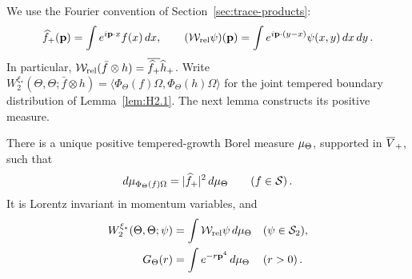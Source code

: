 We use the Fourier convention of Section~\ref{sec:trace-products}:
\begin{equation*}
\widehat{f}_{+}(\mathbf p)=\int e^{i\mathbf p\cdot x}f(x)\,dx,
\qquad (\mathcal{W}_{\mathrm{rel}}\psi)(\mathbf p)=\int e^{i\mathbf p\cdot(y-x)}\psi(x,y)\,dx\,dy\,.
\end{equation*}
In particular, $\mathcal{W}_{\mathrm{rel}}(\bar f\otimes h)=\overline{\widehat{f}_{+}}\widehat{h}_{+}$. Write $W_2^{\xi_*}(\Theta,\Theta;\bar f\otimes h)=\langle\Phi_\Theta(f)\Omega,\Phi_\Theta(h)\Omega\rangle$ for the joint tempered boundary distribution of Lemma~\ref{lem:H2.1}. The next lemma constructs its positive measure.
\begin{lemma}\label{lem:I1.2}
There is a unique positive tempered-growth Borel measure $\mu_{\Theta}$, supported in $\overline{V}_+$, such that
\begin{equation*}
d\mu_{\Phi_\Theta(f)\Omega}=|\widehat{f}_{+}|^2\,d\mu_{\Theta}
\qquad(f\in\mathcal S)\,.
\end{equation*}
It is Lorentz invariant in momentum variables, and
\begin{align*}
W_2^{\xi_*}(\Theta,\Theta;\psi)&=\int\mathcal{W}_{\mathrm{rel}}\psi\,d\mu_{\Theta}&& (\psi\in\mathcal S_2),\\
G_{\Theta}(r)&=\int e^{-r\mathbf p^4}\,d\mu_{\Theta}&& (r>0)\,.
\end{align*}
\end{lemma}
